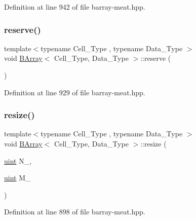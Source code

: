Definition at line 942 of file barray-\/meat.\+hpp.

\mbox{\label{class_b_array_a5eacd388e3d0f638f2c35b6e0f0c490c}} 
\subsubsection{\texorpdfstring{reserve()}{reserve()}}
{\footnotesize\ttfamily template$<$typename Cell\+\_\+\+Type , typename Data\+\_\+\+Type $>$ \\
void \hyperlink{class_b_array}{B\+Array}$<$ Cell\+\_\+\+Type, Data\+\_\+\+Type $>$\+::reserve (\begin{DoxyParamCaption}{ }\end{DoxyParamCaption})\hspace{0.3cm}{\ttfamily [inline]}}



Definition at line 929 of file barray-\/meat.\+hpp.

\mbox{\label{class_b_array_aefe411fe1890273518bfbc3f8ca616ce}} 
\subsubsection{\texorpdfstring{resize()}{resize()}}
{\footnotesize\ttfamily template$<$typename Cell\+\_\+\+Type , typename Data\+\_\+\+Type $>$ \\
void \hyperlink{class_b_array}{B\+Array}$<$ Cell\+\_\+\+Type, Data\+\_\+\+Type $>$\+::resize (\begin{DoxyParamCaption}\item[{\hyperlink{typedefs_8hpp_a91ad9478d81a7aaf2593e8d9c3d06a14}{uint}}]{N\+\_\+,  }\item[{\hyperlink{typedefs_8hpp_a91ad9478d81a7aaf2593e8d9c3d06a14}{uint}}]{M\+\_\+ }\end{DoxyParamCaption})\hspace{0.3cm}{\ttfamily [inline]}}



Definition at line 898 of file barray-\/meat.\+hpp.

\mbox{\label{class_b_array_aaead894ff275479db4f733793ce037db}} 
